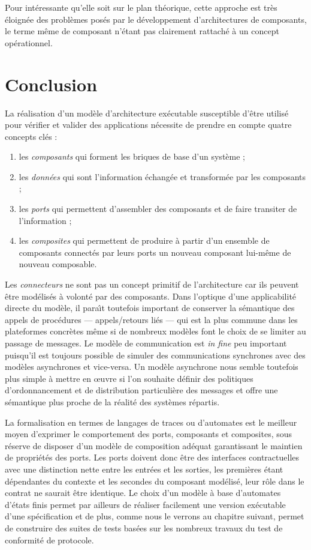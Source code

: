 Pour int\'eressante qu'elle soit sur le plan th\'eorique, cette
approche est tr\`es \'eloign\'ee des probl\`emes pos\'es par le
d\'eveloppement d'architectures de composants, le terme m\^eme de
composant n'\'etant pas clairement rattach\'e \`a un concept
op\'erationnel. 

\section{Conclusion}

La r\'ealisation d'un mod\`ele d'architecture ex\'ecutable
susceptible d'\^etre utilis\'e pour v\'erifier et valider des
applications n\'ecessite de prendre en compte quatre concepts
cl\'es :
\begin{enumerate}
  \item les \emph{composants} qui forment les briques de base d'un syst\`eme
  ;
\item les \emph{donn\'ees} qui sont  l'information \'echang\'ee et
  transform\'ee par les composants ;
\item les \emph{ports} qui permettent d'assembler des composants et
  de faire transiter de l'information ;
\item les \emph{composites} qui permettent de produire \`a partir d'un ensemble
  de composants connect\'es par leurs ports un nouveau composant
  lui-m\^eme de nouveau composable.
\end{enumerate}
Les \emph{connecteurs} ne sont pas un concept primitif de l'architecture car
ils peuvent \^etre mod\'elis\'es \`a volont\'e par des
composants. Dans l'optique d'une applicabilit\'e directe du
mod\`ele, il para\^{\i}t toutefois important de conserver la
s\'emantique des appels de proc\'edures --- appels/retours li\'es
--- qui est la plus commune dans les plateformes concr\`etes m\^eme
si de nombreux mod\`eles font le choix de se limiter au passage de
messages. Le mod\`ele de communication est \emph{in fine} peu
important puisqu'il est toujours possible de simuler des
communications synchrones avec des mod\`eles asynchrones et
vice-versa. Un mod\`ele asynchrone nous semble toutefois plus simple
\`a mettre en \oe uvre si l'on souhaite d\'efinir des politiques
d'ordonnancement et de distribution particuli\`ere des messages et
offre une s\'emantique  plus proche de la r\'ealit\'e des syst\`emes r\'epartis. 

La formalisation en termes de langages de traces ou d'automates est le
meilleur moyen d'exprimer le comportement des ports, composants et
composites, sous r\'eserve de disposer d'un mod\`ele de composition
ad\'equat garantissant le maintien de propri\'et\'es des
ports. Les ports doivent donc \^etre des interfaces contractuelles
avec une distinction nette entre les entr\'ees et les sorties, les
premi\`eres \'etant d\'ependantes du contexte et les secondes du
composant mod\'elis\'e, leur r\^ole dans le contrat ne saurait
\^etre identique. Le choix d'un mod\`ele \`a base d'automates
d'\'etats finis permet par ailleurs de r\'ealiser facilement une
version ex\'ecutable d'une sp\'ecification et de plus, comme nous le
verrons au chapitre suivant, permet de construire des suites de
tests bas\'ees sur les nombreux travaux du test de conformit\'e de
protocole. 

